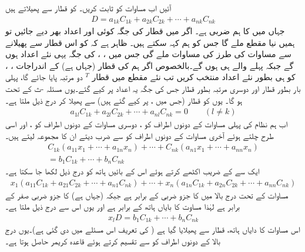 آئیں اب مساوات  کو ثابت کریں۔ کو قطار  سے پھیلاتے ہیں
\begin{align}\label{مساوات_الجبرا_ثبوت_الف}
D=a_{1k}C_{1k}+a_{2k}C_{2k}+\cdots+a_{nk}C_{nk}
\end{align}
جہاں  میں  کا ہم ضربی  ہے۔ اگر  میں قطار  کی جگہ کوئی اور اعداد بھر دیے جائیں تو ہمیں نیا مقطع ملے گا جس کو ہم  کہہ سکتے ہیں۔ ظاہر ہے کہ  کو اس  قطار سے پھیلانے سے مساوات   کی طرز کی مساوات ملے گی جس میں ، ،  کی جگہ یہی نئے اعداد ہوں گے جبکہ  پہلے والے ہی ہوں گے۔بالخصوص اگر ہم  کی قطار   (جہاں  ہے)  کے اندراجات ، ،  کو  ہی بطور نئے اعداد منتخب کریں تب نئے مقطع  میں قطار 
\begin{math}
[\begin{matrix}a_{1l}&\cdots&a_{nl}  \end{matrix}]^T
\end{math}
دو مرتبہ پایا جائے گا، پہلی بار بطور قطار  اور دوسری مرتبہ بطور قطار  جس کی جگہ یہ اعداد پر کیے گئے۔یوں مسئلہ -ث کے تحت  ہو گا۔ یوں  کو قطار  (جس میں ،  پر کیے گئے ہیں) سے پھیلا کر درج ذیل ملتا ہے۔
\begin{align}\label{مساوات_الجبرا_ثبوت_ب}
a_{1l}C_{1k}+a_{2l}C_{2k}+\cdots+a_{nl}C_{nk}=0\quad\quad (l \ne k)
\end{align}
اب ہم نظام  کی پہلی مساوات کے دونوں اطراف کو ، دوسری مساوات کے دونوں اطراف کو ، اور اسی طرح چلتے ہوئے آخری مساوات کے دونوں اطراف کو  سے ضرب دیتے ان کا مجموعہ لیتے ہیں۔
\begin{multline}\label{مساوات_الجبرا_ثبوت_پ}
C_{1k}(a_{11}x_1+\cdots+a_{1n}x_n)+\cdots+C_{nk}(a_{n1}x_1+\cdots+a_{nn}x_n)\\
=b_1C_{1k}+\cdots+b_nC_{nk}
\end{multline}
ایک سے   کے  ضریب  اکٹھے کرتے ہوئے اس کے بائیں ہاتھ کو درج ذیل لکھا جا سکتا ہے۔
\begin{align*}
x_1(a_{11}C_{1k}+a_{21}C_{2k}+\cdots+a_{n1}C_{nk})+\cdots+x_n(a_{1n}C_{1k}+a_{2n}C_{2k}+\cdots+a_{nn}C_{nk})
\end{align*}
مساوات  کے تحت درج بالا میں   کا جزو ضربی  کے برابر ہے جبکہ  (جہاں  ہے) کا جزو ضربی صفر کے برابر ہے لہٰذا  مساوت  کا بایاں ہاتھ  کے برابر ہے اور یوں اس سے درج ذیل ملتا ہے۔
\begin{align*}
x_l D=b_1C_{1k}+\cdots+b_nC_{nk}
\end{align*}
اس مساوات کا دایاں ہاتھ، قطار  سے پھیلایا گیا  ہے ( کی تعریف اس مسئلے میں دی گئی ہے)۔یوں درج بالا کے دونوں اطراف کو  سے تقسیم کرتے ہوئے قاعدہ کریمر حاصل ہوتا ہے۔

